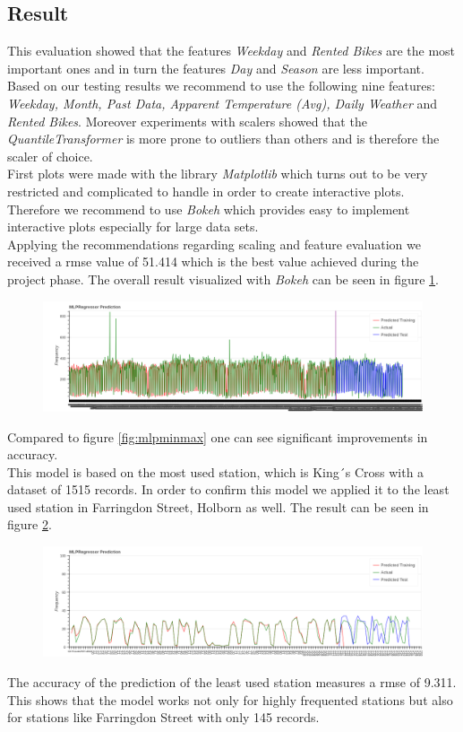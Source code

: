 \subsection{Result}\label{sec:resultmlp}
This evaluation showed that the features \emph{Weekday} and \emph{Rented Bikes} are the most important ones and in turn the features \emph{Day} and \emph{Season} are less important.
Based on our testing results we recommend to use the following nine features: \emph{Weekday, Month, Past Data, Apparent Temperature (Avg), Daily Weather} and \emph{Rented Bikes}. 
Moreover experiments with scalers showed that the \emph{QuantileTransformer} is more prone to outliers than others and is therefore the scaler of choice.\\
First plots were made with the library \emph{Matplotlib} which turns out to be very restricted and complicated to handle in order to create interactive plots. Therefore we recommend to use \emph{Bokeh} which provides easy to implement interactive plots especially for large data sets.\\
Applying the recommendations regarding scaling and feature evaluation we received a \acs{rmse} value of 51.414 which is the best value achieved during the project phase. The overall result visualized with \emph{Bokeh} can be seen in figure \ref{fig:mlpquantile}.
\begin{figure}[H]
\hspace{-2.8cm}
\includegraphics[width=1.4\textwidth]{img/mlpquantile}\label{fig:mlpquantile}
\label{fig:mlpquantile}
\end{figure}
Compared to figure \ref{fig:mlpminmax} one can see significant improvements in accuracy.\\
This model is based on the most used station, which is King´s Cross with a dataset of 1515 records. In order to confirm this model we applied it to the least used station in Farringdon Street, Holborn as well. The result can be seen in figure  \ref{fig:mlpquantile_least}.
\begin{figure}[H]
\hspace{-2.8cm}
\includegraphics[width=1.4\textwidth]{img/mlpquantile_least}\label{fig:mlpquantile_least}
\label{fig:mlpquantile_least}
\end{figure}
The accuracy of the prediction of the least used station measures a \acs{rmse} of 9.311. This shows that the model works not only for highly frequented stations but also for stations like Farringdon Street with only 145 records.